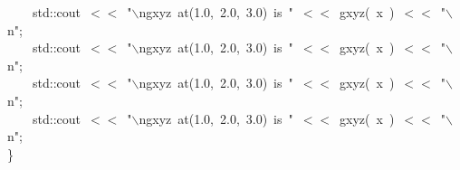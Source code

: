 \documentclass[9pt,onside]{article}
\newcommand{\hlstd}[1]{\textcolor[rgb]{0.2,0,0.4}{#1}}
\newcommand{\hlesc}[1]{\textcolor[rgb]{0.65,0.09,0.38}{#1}}
\newcommand{\hlstr}[1]{\textcolor[rgb]{0.09,0.38,0.65}{#1}}
\newcommand{\hlopt}[1]{\textcolor[rgb]{0.33,0.33,0.33}{#1}}
\newcommand{\hlkwd}[1]{\textcolor[rgb]{0.82,0.11,0.93}{#1}}
\begin{document}
{\hlstd{}\hlstd{\ \ \ \ }\hlstd{std}\hlopt{::}\hlstd{cout\ }\hlopt{$<$$<$\ }\hlstd{}\hlstr{"}\hlesc{$\backslash$n}\hlstr{gxyz\ at(1.0,\ 2.0,\ 3.0)\ is\ "}\hlstd{\ }\hlopt{$<$$<$\ }\hlstd{}\hlkwd{gxyz}\hlstd{}\hlopt{(\ }\hlstd{x\ }\hlopt{)\ $<$$<$\ }\hlstd{}\hlstr{"}\hlesc{$\backslash$n}\hlstr{"}\hlstd{}\hlopt{;}\hspace*{\fill}\\
\hlstd{}\hlstd{\ \ \ \ }\hlstd{std}\hlopt{::}\hlstd{cout\ }\hlopt{$<$$<$\ }\hlstd{}\hlstr{"}\hlesc{$\backslash$n}\hlstr{gxyz\ at(1.0,\ 2.0,\ 3.0)\ is\ "}\hlstd{\ }\hlopt{$<$$<$\ }\hlstd{}\hlkwd{gxyz}\hlstd{}\hlopt{(\ }\hlstd{x\ }\hlopt{)\ $<$$<$\ }\hlstd{}\hlstr{"}\hlesc{$\backslash$n}\hlstr{"}\hlstd{}\hlopt{;}\hspace*{\fill}\\
\hlstd{}\hlstd{\ \ \ \ }\hlstd{std}\hlopt{::}\hlstd{cout\ }\hlopt{$<$$<$\ }\hlstd{}\hlstr{"}\hlesc{$\backslash$n}\hlstr{gxyz\ at(1.0,\ 2.0,\ 3.0)\ is\ "}\hlstd{\ }\hlopt{$<$$<$\ }\hlstd{}\hlkwd{gxyz}\hlstd{}\hlopt{(\ }\hlstd{x\ }\hlopt{)\ $<$$<$\ }\hlstd{}\hlstr{"}\hlesc{$\backslash$n}\hlstr{"}\hlstd{}\hlopt{;}\hspace*{\fill}\\
\hlstd{}\hlstd{\ \ \ \ }\hlstd{std}\hlopt{::}\hlstd{cout\ }\hlopt{$<$$<$\ }\hlstd{}\hlstr{"}\hlesc{$\backslash$n}\hlstr{gxyz\ at(1.0,\ 2.0,\ 3.0)\ is\ "}\hlstd{\ }\hlopt{$<$$<$\ }\hlstd{}\hlkwd{gxyz}\hlstd{}\hlopt{(\ }\hlstd{x\ }\hlopt{)\ $<$$<$\ }\hlstd{}\hlstr{"}\hlesc{$\backslash$n}\hlstr{"}\hlstd{}\hlopt{;}\hspace*{\fill}\\
\hlstd{}\hlopt{\}}\hspace*{\fill}\\
}
\normalfont
\normalsize
\end{document}
